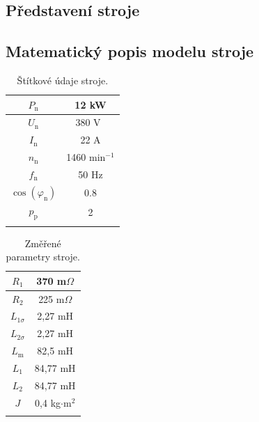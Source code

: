 \documentclass[a4paper, twoside, 11pt]{article}
\begin{document}
	\subsection{Představení stroje}
	\subsection{Matematický popis modelu stroje}
	\begin{minipage}[t]{0.47\textwidth}
        \vspace{\baselineskip}
        \begin{table}[H]
            \caption{Štítkové údaje stroje.}
            \centering
                \begin{tabular}{!{\vrule width 2pt} c | c !{\vrule width 2pt}}
                    $P_\text{n}$ & 12 kW \\ \hline
                    $U_\text{n}$ & 380 V~\\ \hline
                    $I_\text{n}$ & 22 A\\ \hline
                    $n_\text{n}$ & 1460 min$^{-1}$ \\ \hline
                    $f_\text{n}$ & 50 Hz \\ \hline
                    $\cos(\varphi_\text{n})$ &  0.8 \\ \hline
                    $p_\text{p}$ & 2 \\ 
                \end{tabular}     
            \label{tab:stitkove-udaje}
        \end{table}
        \end{minipage}%
        \hfill
        \begin{minipage}[t]{0.47\textwidth}
            \vspace{0pt}
            \begin{table}[H]
                \caption{Změřené parametry stroje.}
                \centering
                    \begin{tabular}{!{\vrule width 2pt} c | c !{\vrule width 2pt}}
                        $R_\text{1}$ & 370 m$\Omega$ \\ \hline
                        $R_\text{2}$ & 225 m$\Omega$ \\ \hline
                        $L_{1\sigma}$ & 2,27 mH \\ \hline
                        $L_{2\sigma}$ & 2,27 mH \\ \hline
                        $L_\text{m}$ & 82,5 mH \\ \hline
                        $L_{1}$ & 84,77 mH \\ \hline
                        $L_{2}$ & 84,77 mH \\ \hline $J$ & 0,4 kg$\cdot$m$^{2}$ \\ 
                    \end{tabular}     
                \label{tab:zmerene-parametry-stroje}
            \end{table}
        \end{minipage}
\end{document}
